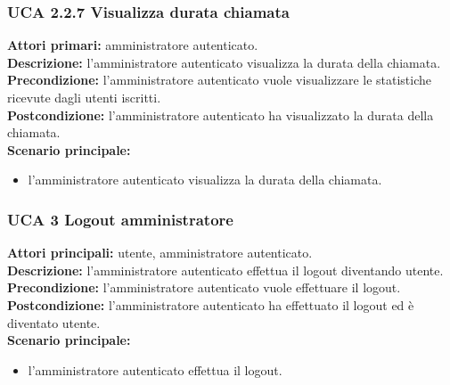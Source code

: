 \subsubsection{UCA 2.2.7 Visualizza durata chiamata}
\noindent 
\textbf{Attori primari:} amministratore autenticato.\\
\textbf{Descrizione:} l'amministratore autenticato visualizza la durata della chiamata.\\
\textbf{Precondizione:} l'amministratore autenticato vuole visualizzare le statistiche ricevute dagli utenti iscritti.\\
\textbf{Postcondizione:} l'amministratore autenticato ha visualizzato la durata della chiamata.\\
\textbf{Scenario principale:}
\begin{itemize}
\item l'amministratore autenticato visualizza la durata della chiamata.
\end{itemize}

\subsubsection{UCA 3 Logout amministratore}
\noindent 
\textbf{Attori principali:} utente, amministratore autenticato.\\
\textbf{Descrizione:} l'amministratore autenticato effettua il logout diventando utente.\\
\textbf{Precondizione:} l'amministratore autenticato vuole effettuare il logout.\\
\textbf{Postcondizione:} l'amministratore autenticato ha effettuato il logout ed è diventato utente.\\
\textbf{Scenario principale:}
\begin{itemize}
\item l'amministratore autenticato effettua il logout.
\end{itemize}